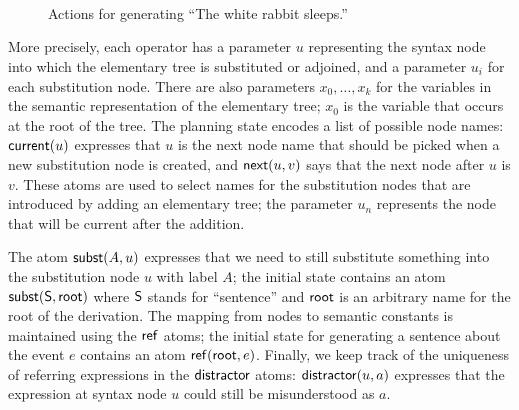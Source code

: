 \begin{figure}
{\small%
\\

\\

}\strut\\[-5ex]
\caption{Actions for generating ``The white rabbit
sleeps.''}
\label{fig:white-rabbit-as-planning}
\end{figure}

More precisely, each operator has a parameter $u$ representing the
syntax node into which the elementary tree is substituted or adjoined,
and a parameter $u_i$ for each substitution node.  There are also
parameters $x_0,\ldots,x_k$ for the variables in the semantic
representation of the elementary tree; $x_0$ is the variable that
occurs at the root of the tree.  The planning state encodes a list of
possible node names: $\mathsf{current}(u)$ expresses that $u$ is the next
node name that should be picked when a new substitution node is
created, and $\mathsf{next}(u,v)$ says that the next node after $u$ is
$v$. These atoms are used to select names for the substitution nodes
that are introduced by adding an elementary tree; the parameter $u_n$
represents the node that will be current after the addition.

The atom $\mathsf{subst}(A,u)$ expresses that we need to still substitute
something into the substitution node $u$ with label $A$; the initial
state contains an atom $\mathsf{subst}(\mathsf{S},\mathsf{root})$ where $\mathsf{S}$
stands for ``sentence'' and $\mathsf{root}$ is an arbitrary name for the
root of the derivation.  The mapping from nodes to semantic constants
is maintained using the $\mathsf{ref}$ atoms; the initial state for
generating a sentence about the event $e$ contains an atom
$\mathsf{ref}(\mathsf{root},e)$.  Finally, we keep track of the uniqueness of
referring expressions in the $\mathsf{distractor}$ atoms:
$\mathsf{distractor}(u,a)$ expresses that the expression at syntax node $u$
could still be misunderstood as $a$.

